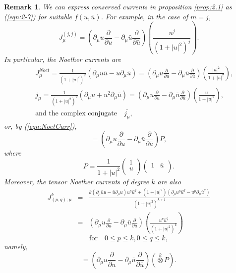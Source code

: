 \documentclass[makeidx,12pt,openany]{report}
\newtheorem{rmk}[df]{Remark}
\begin{document}
\begin{rmk}
We can express conserved currents in proposition \ref{prop:2.1} as 
(\ref{eqn:2-7}) for suitable $f(u,\bar{u})$. 
For example, in the case of $m=j$, 
$$
J_{\mu}^{(j,j)}=
 \left(
 \partial_{\mu}u\frac{\partial}{\partial u}
 -\partial_{\mu}\bar{u}\frac{\partial}{\partial \bar{u}}
 \right) 
 \left(
 \frac{u^j}{(1+|u|^2)^j} 
 \right) .
$$
In particular, the Noether currents are 
\begin{eqnarray*}
 && J_{\mu}^{Noet}=\frac{1}{(1+|u|^2)^2}
       (\partial_{\mu}u\bar{u}-u \partial_{\mu}\bar{u})
  =\left( \partial_{\mu}u \frac{\partial}{\partial u}
   -\partial_{\mu}\bar{u}\frac{\partial}{\partial \bar{u}}\right) 
   \left( \frac{|u|^2}{1+|u|^2}\right) , \\
 && j_{\mu}=\frac{1}{(1+|u|^2)^2}
       (\partial_{\mu}u +u^2 \partial_{\mu}\bar{u})
  =\left( \partial_{\mu}u \frac{\partial}{\partial u}
   -\partial_{\mu}\bar{u}\frac{\partial}{\partial \bar{u}}\right) 
   \left( \frac{u}{1+|u|^2}\right) , \\
 && \mbox{and the complex conjugate} \quad \bar{j_{\mu}},
\end{eqnarray*}
or, by (\ref{eqn:NoetCurr}), 
\begin{equation}
 [\partial_{\mu}P, P]
 =\left( \partial_{\mu}u \frac{\partial}{\partial u}
   -\partial_{\mu}\bar{u}\frac{\partial}{\partial \bar{u}}\right) P, 
\end{equation}
where 
$$
P=\frac{1}{1+|u|^2}
 \left(
 \begin{array}{c}
     1 \\
     u \\
 \end{array}
 \right)
 \left(
 \begin{array}{cc}
     1  & \bar{u} \\
 \end{array}
 \right) .
$$
Moreover, the tensor Noether currents of degree $k$ are also 
\begin{eqnarray*}
J^k_{(p,q);{\mu}}
&=&
 \frac{
 k(\partial_{\mu}\bar{u}u-\bar{u}\partial_{\mu}u)u^{p}\bar{u}^{q}+
 (1+|u|^2)(\partial_{\mu}u^{p}\bar{u}^{q}-u^{p}\partial_{\mu}
 \bar{u}^{q})}
 {(1+|u|^2)^{k+1}}\\
&=&
 \left(
 \partial_{\mu}u\frac{\partial}{\partial u}
 -\partial_{\mu}\bar{u}\frac{\partial}{\partial \bar{u}}
 \right) 
 \left(
 \frac{u^p \bar{u}^q}{(1+|u|^2)^k} 
 \right)
\end{eqnarray*}
$$\mbox{for} \quad 0\le p \le k,0 \le q \le k, $$
namely, 
\begin{equation}
[\partial_{\mu}(\stackrel{k}{\otimes} \! P),\stackrel{k}{\otimes} \! P]
=\left(
 \partial_{\mu}u\frac{\partial}{\partial u}
 -\partial_{\mu}\bar{u}\frac{\partial}{\partial \bar{u}}
 \right) (\stackrel{k}{\otimes} \! P). 
\end{equation}
\end{rmk}
\end{document}
